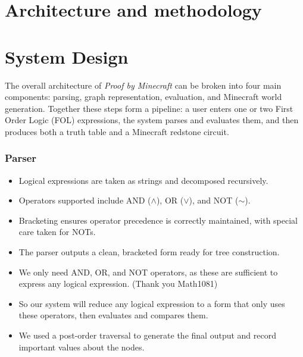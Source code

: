 \documentclass[11pt]{diazessay} %
\begin{document}

\section*{Architecture and methodology}

\section{System Design}

The overall architecture of \textit{Proof by Minecraft} can be broken into four
main components: parsing, graph representation, evaluation, and Minecraft
world generation. Together these steps form a pipeline: a user enters one
or two First Order Logic (FOL) expressions, the system parses and evaluates
them, and then produces both a truth table and a Minecraft redstone circuit.

\subsubsection*{Parser}
\begin{itemize}
    \item Logical expressions are taken as strings and decomposed recursively.
    \item Operators supported include AND ($\wedge$), OR ($\vee$), and NOT ($\sim$).
    \item Bracketing ensures operator precedence is correctly maintained, with 
    special care taken for NOTs.
    \item The parser outputs a clean, bracketed form ready for tree construction.
    \item We only need AND, OR, and NOT operators, as these are sufficient to express any logical expression. (Thank you Math1081)
    \item So our system will reduce any logical expression to a form that only uses these operators, then evaluates and compares them.
    \item We used a post-order traversal to generate the final output and record important values about the nodes.
\end{itemize}
\end{document}

